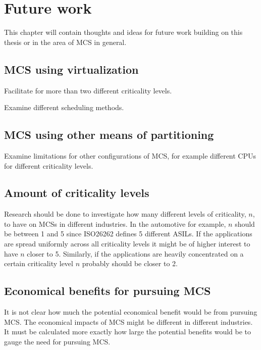 \chapter{Future work}
This chapter will contain thoughts and ideas for future work building on this thesis or in the area of MCS in general.

\section{MCS using virtualization}
Facilitate for more than two different criticality levels.

Examine different scheduling methods. %

\section{MCS using other means of partitioning}
Examine limitations for other configurations of MCS, for example different CPUs for different criticality levels.

\section{Amount of criticality levels}
Research should be done to investigate how many different levels of criticality, $n$, to have on MCSs in different industries. In the automotive for example, $n$ should be between 1 and 5 since ISO26262 defines 5 different ASILs. If the applications are spread uniformly across all criticality levels it might be of higher interest to have $n$ closer to 5. Similarly, if the applications are heavily concentrated on a certain criticality level $n$ probably should be closer to 2.

\section{Economical benefits for pursuing MCS}
It is not clear how much the potential economical benefit would be from pursuing MCS. The economical impacts of MCS might be different in different industries. It must be calculated more exactly how large the potential benefits would be to gauge the need for pursuing MCS.